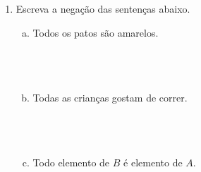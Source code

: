 \documentclass[a4paper,14pt]{article}
\begin{document}
\begin{multicols}{2}
\begin{enumerate}
\begin{enumerate}[a)]
				\item $R$ é parte de $S$. \\\\\\\\
				\item \{1, 2\} está contido em $F$. \\\\\\\\
				\item \{7\} não está contido em $G$. \\\\\\\\
				\item O conjunto vazio está contido em $T$. \\\\\\\\
				\item O conjunto cujo elemento é o conjunto vazio é subconjunto de $L$. \\\\\\\\
			\end{enumerate}
			\item Escreva a negação das sentenças abaixo.
			\begin{enumerate}[a)]
				\item Todos os patos são amarelos. \\\\\\\\
				\item Todas as crianças gostam de correr. \\\\\\\\
				\item Todo elemento de $B$ é elemento de $A$. \\\\\\\\
			\end{enumerate}
		\end{enumerate}

\end{multicols}
\end{document}

